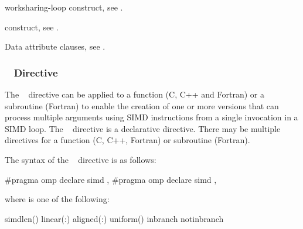 \begin{samepage}
\begin{crossrefs}
\item worksharing-loop construct, see
.

\item {} construct, see
.

\item Data attribute clauses, see
.
\end{crossrefs}
\end{samepage}



\subsubsection{~ Directive}
\label{subsubsec:declare simd Directive}
\summary
The ~ directive can be applied to a function 
(C, C++ and Fortran) or a subroutine (Fortran) to enable the creation 
of one or more versions that can process multiple arguments using SIMD 
instructions from a single invocation in a SIMD loop. The 
~ directive is a declarative directive. There 
may be multiple ~ directives for a function 
(C, C++, Fortran) or subroutine (Fortran).

\syntax
The syntax of the ~ directive is as follows:

\begin{ccppspecific}
\begin{ompcPragma}
#pragma omp declare simd \plc{[clause[ [},\plc{] clause] ... ] new-line}
\plc{[}#pragma omp declare simd \plc{[clause[ [},\plc{] clause] ... ] new-line]}
\plc{[ ... ]}
\end{ompcPragma}

where  is one of the following:

\begin{indentedcodelist}
simdlen()
linear(\plc{linear-list[ }:\plc{ linear-step]})
aligned(\plc{argument-list[ }:\plc{ alignment]})
uniform()
inbranch
notinbranch
\end{indentedcodelist}
\end{ccppspecific}


